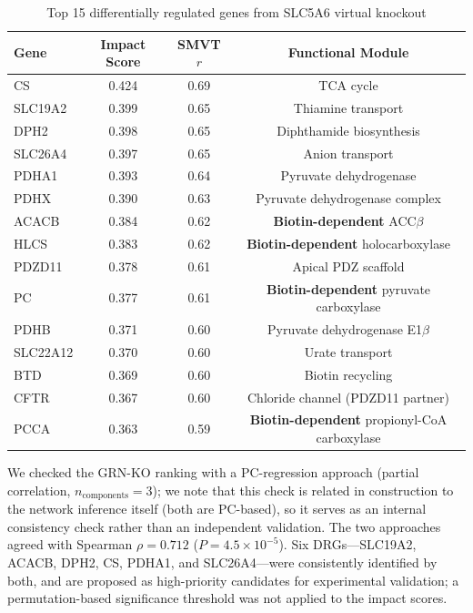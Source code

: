 \documentclass[pdflatex,sn-nature]{sn-jnl}
\begin{document}
\begin{table}[t]
\centering
\caption{Top 15 differentially regulated genes from SLC5A6 virtual knockout}
\label{tab:drg}
\begin{tabular}{lccc}
\toprule
Gene & Impact Score & SMVT $r$ & Functional Module \\
\midrule
CS       & 0.424 & 0.69 & TCA cycle \\
SLC19A2  & 0.399 & 0.65 & Thiamine transport \\
DPH2     & 0.398 & 0.65 & Diphthamide biosynthesis \\
SLC26A4  & 0.397 & 0.65 & Anion transport \\
PDHA1    & 0.393 & 0.64 & Pyruvate dehydrogenase \\
PDHX     & 0.390 & 0.63 & Pyruvate dehydrogenase complex \\
ACACB    & 0.384 & 0.62 & \textbf{Biotin-dependent} ACC$\beta$ \\
HLCS     & 0.383 & 0.62 & \textbf{Biotin-dependent} holocarboxylase \\
PDZD11   & 0.378 & 0.61 & Apical PDZ scaffold \\
PC       & 0.377 & 0.61 & \textbf{Biotin-dependent} pyruvate carboxylase \\
PDHB     & 0.371 & 0.60 & Pyruvate dehydrogenase E1$\beta$ \\
SLC22A12 & 0.370 & 0.60 & Urate transport \\
BTD      & 0.369 & 0.60 & Biotin recycling \\
CFTR     & 0.367 & 0.60 & Chloride channel (PDZD11 partner) \\
PCCA     & 0.363 & 0.59 & \textbf{Biotin-dependent} propionyl-CoA carboxylase \\
\bottomrule
\end{tabular}
\end{table}

We checked the GRN-KO ranking with a PC-regression approach (partial correlation, $n_{\text{components}}=3$); we note that this check is related in construction to the network inference itself (both are PC-based), so it serves as an internal consistency check rather than an independent validation. The two approaches agreed with Spearman $\rho = 0.712$ ($P = 4.5\times10^{-5}$). Six DRGs---SLC19A2, ACACB, DPH2, CS, PDHA1, and SLC26A4---were consistently identified by both, and are proposed as high-priority candidates for experimental validation; a permutation-based significance threshold was not applied to the impact scores.
\end{document}
